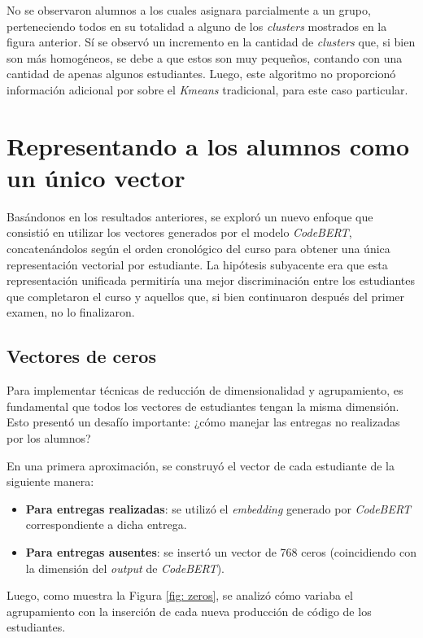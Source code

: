 \documentclass[11pt,a4paper,twoside,openany]{tesis}
\begin{document}
No se observaron alumnos a los cuales asignara parcialmente a un grupo, perteneciendo todos en su totalidad a alguno de los \emph{clusters} mostrados en la figura anterior. Sí se observó un incremento en la cantidad de \emph{clusters} que, si bien son más homogéneos, se debe a que estos son muy pequeños, contando con una cantidad de apenas algunos estudiantes. Luego, este algoritmo no proporcionó información adicional por sobre el \emph{Kmeans} tradicional, para este caso particular.

\section{Representando a los alumnos como un único vector}

Basándonos en los resultados anteriores, se exploró un nuevo enfoque que consistió en utilizar los vectores generados por el modelo \emph{CodeBERT}, concatenándolos según el orden cronológico del curso para obtener una única representación vectorial por estudiante. La hipótesis subyacente era que esta representación unificada permitiría una mejor discriminación entre los estudiantes que completaron el curso y aquellos que, si bien continuaron después del primer examen, no lo finalizaron.

\subsection{Vectores de ceros}

Para implementar técnicas de reducción de dimensionalidad y agrupamiento, es fundamental que todos los vectores de estudiantes tengan la misma dimensión. Esto presentó un desafío importante: ¿cómo manejar las entregas no realizadas por los alumnos?

En una primera aproximación, se construyó el vector de cada estudiante de la siguiente manera:

\begin{itemize}
    \item \textbf{Para entregas realizadas}: se utilizó el \emph{embedding} generado por \emph{CodeBERT} correspondiente a dicha entrega.
    \item\textbf{Para entregas ausentes}: se insertó un vector de 768 ceros (coincidiendo con la dimensión del \emph{output} de \emph{CodeBERT}).
\end{itemize}

Luego, como muestra la Figura \ref{fig: zeros}, se analizó cómo variaba el agrupamiento con la inserción de cada nueva producción de código de los estudiantes.
\end{document}

